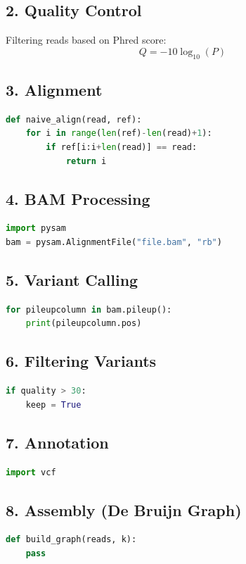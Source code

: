 \documentclass[12pt]{article}
\begin{document}
\subsection{2. Quality Control}
Filtering reads based on Phred score:
\begin{equation}
Q = -10 \log_{10}(P)
\end{equation}

\subsection{3. Alignment}
\begin{lstlisting}[language=Python]
def naive_align(read, ref):
    for i in range(len(ref)-len(read)+1):
        if ref[i:i+len(read)] == read:
            return i
\end{lstlisting}

\subsection{4. BAM Processing}
\begin{lstlisting}[language=Python]
import pysam
bam = pysam.AlignmentFile("file.bam", "rb")
\end{lstlisting}

\subsection{5. Variant Calling}
\begin{lstlisting}[language=Python]
for pileupcolumn in bam.pileup():
    print(pileupcolumn.pos)
\end{lstlisting}

\subsection{6. Filtering Variants}
\begin{lstlisting}[language=Python]
if quality > 30:
    keep = True
\end{lstlisting}

\subsection{7. Annotation}
\begin{lstlisting}[language=Python]
import vcf
\end{lstlisting}

\subsection{8. Assembly (De Bruijn Graph)}
\begin{lstlisting}[language=Python]
def build_graph(reads, k):
    pass
\end{lstlisting}
\end{document}
